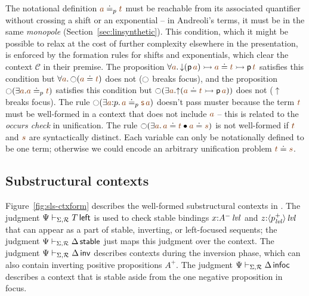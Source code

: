 The notational definition $\lf{a} \doteq_p \lf{t}$ 
must be reachable from its
associated quantifier without crossing a shift or an exponential -- in
Andreoli's terms, it must be in the same {\it monopole}
(Section~\ref{sec:linsynthetic}).  This condition,
which it might be possible to relax at the cost of further
complexity elsewhere in the presentation, is enforced by the formation
rules for shifts and exponentials, which clear the context $\mathcal C$
in their premise. 
%
The proposition $\forall \lf{a}.\, {\downarrow}({\sf p}\,\lf{a})
\lefti \lf{a} \doteq \lf{t} \lefti {\sf p}\,\lf{t}$ satisfies this
condition but $\forall \lf{a}.\,{\ocircle}(\lf{a} \doteq \lf{t})$ does
not ($\ocircle$ breaks focus), and the proposition ${\ocircle}(\exists
\lf{a}. \lf{a} \doteq_p \lf{t})$ satisfies this condition but
${\ocircle}(\exists \lf{a}.  {\uparrow}(\lf{a} \doteq \lf{t} \lefti
{\sf p}\,\lf{a}))$ does not (${\uparrow}$ breaks focus). The rule
${\ocircle}(\exists \lf{a}{:}p.\,\lf{a} \doteq_p \lf{{\sf s}\,a})$
doesn't pass muster because the term $\lf{t}$ must be well-formed in a
context that does not include $\lf{a}$ -- this is related to the {\it
  occurs check} in unification.
%
The rule ${\ocircle}(\exists \lf{a}.\,
\lf{a} \doteq \lf{t} \fuse \lf{a} \doteq \lf{s})$ is not well-formed 
if $\lf{t}$ and $\lf{s}$ are syntactically distinct.
Each variable can only be notationally defined to be one 
term; otherwise we could encode an arbitrary
unification problem $\lf{t} \doteq \lf{s}$.




\subsection{Substructural contexts}



Figure~\ref{fig:sls-ctxform} describes the well-formed substructural
contexts in \sls. The judgment $\Psi \vdash_{\Sigma,\mathcal R} T\,{\sf
  left}$ is used to check stable bindings $x{:}{A^-}\,{{\it lvl}}$ and
$z{:}{\langle {p^+_{\it lvl}} \rangle}\,{{\it lvl}}$ that can appear as a part of stable,
inverting, or left-focused sequents; the judgment $\Psi
\vdash_{\Sigma,\mathcal R} \Delta\,{\sf stable}$ just maps this judgment
over the context. The judgment $\Psi \vdash_{\Sigma,\mathcal R}
\Delta\,{\sf inv}$ describes contexts during the inversion phase,
which can also contain inverting positive propositions $A^+$. The
judgment $\Psi \vdash_{\Sigma,\mathcal R} \Delta\,{\sf infoc}$ describes
a context that is stable aside from the one negative proposition in
focus. 

